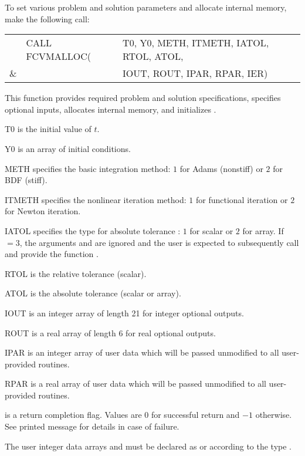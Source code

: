 \begin{Steps}
  To set various problem and solution parameters and allocate
  internal memory, make the following call:
  {
    \begin{tabular}[t]{@{}r@{}l@{}l}
        &CALL FCVMALLOC(&T0, Y0, METH, ITMETH, IATOL, RTOL, ATOL, \\
    {\&}&               &IOUT, ROUT, IPAR, RPAR, IER)
    \end{tabular}
  }
  {
    This function provides required problem and solution specifications, 
    specifies optional inputs,
    allocates internal memory, and initializes {\cvode}.
  }
  {
    \begin{args}[ITMETH]
    \item[T0] is the initial value of $t$.
    \item[Y0] is an array of initial conditions.
    \item[METH] specifies the  basic integration method: 
      $1$ for Adams (nonstiff) or $2$ for BDF (stiff).
    \item[ITMETH] specifies the nonlinear iteration method: 
      $1$ for functional iteration or $2$ for Newton iteration.
    \item[IATOL] specifies the type for absolute tolerance :
      $1$ for scalar or $2$ for array. If $=3$, the arguments
       and  are ignored and the user is expected to
      subsequently call  and provide the function .
    \item[RTOL] is the relative tolerance (scalar).
    \item[ATOL] is the absolute tolerance (scalar or array).
    \item[IOUT] is an integer array of length 21 for integer optional outputs.
    \item[ROUT] is a real array of length 6 for real optional outputs.
    \item[IPAR] is an integer array of user data which will be passed
      unmodified to all user-provided routines.
    \item[RPAR] is a real array of user data which will be passed
      unmodified to all user-provided routines.
    \end{args}
  }
  {
     is a return completion flag.  Values are $0$ for successful return
    and $-1$ otherwise. See printed message for details in case of failure.
  }
  {
    The user integer data arrays  and  must be declared as
     or  according to the {\CC} type .

}
\end{Steps}
